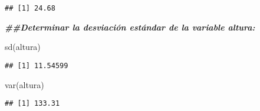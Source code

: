 \documentclass[
]{article}
\newenvironment{Shaded}{\begin{snugshade}}{\end{snugshade}}
\newcommand{\DocumentationTok}[1]{\textcolor[rgb]{0.56,0.35,0.01}{\textbf{\textit{#1}}}}
\newcommand{\FunctionTok}[1]{\textcolor[rgb]{0.00,0.00,0.00}{#1}}
\newcommand{\NormalTok}[1]{#1}
\begin{document}
\begin{verbatim}
## [1] 24.68
\end{verbatim}

\begin{Shaded}
\begin{Highlighting}[]
\DocumentationTok{\#\#Determinar la desviación estándar de la variable altura:}

\FunctionTok{sd}\NormalTok{(altura)}
\end{Highlighting}
\end{Shaded}

\begin{verbatim}
## [1] 11.54599
\end{verbatim}

\begin{Shaded}
\begin{Highlighting}[]
\FunctionTok{var}\NormalTok{(altura)}
\end{Highlighting}
\end{Shaded}

\begin{verbatim}
## [1] 133.31
\end{verbatim}
\end{document}
